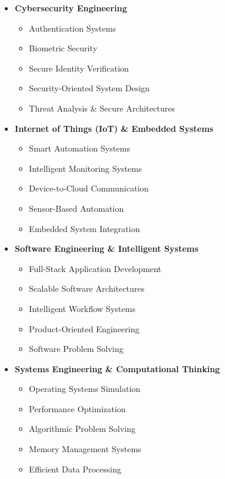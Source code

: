 \documentclass[a4paper,11pt]{article}
\begin{document}
\begin{itemize}[leftmargin=0.15in]

\item \textbf{Cybersecurity Engineering}
\begin{itemize}
    \item Authentication Systems
    \item Biometric Security
    \item Secure Identity Verification
    \item Security-Oriented System Design
    \item Threat Analysis \& Secure Architectures
\end{itemize}

\item \textbf{Internet of Things (IoT) \& Embedded Systems}
\begin{itemize}
    \item Smart Automation Systems
    \item Intelligent Monitoring Systems
    \item Device-to-Cloud Communication
    \item Sensor-Based Automation
    \item Embedded System Integration
\end{itemize}

\item \textbf{Software Engineering \& Intelligent Systems}
\begin{itemize}
    \item Full-Stack Application Development
    \item Scalable Software Architectures
    \item Intelligent Workflow Systems
    \item Product-Oriented Engineering
    \item Software Problem Solving
\end{itemize}

\item \textbf{Systems Engineering \& Computational Thinking}
\begin{itemize}
    \item Operating Systems Simulation
    \item Performance Optimization
    \item Algorithmic Problem Solving
    \item Memory Management Systems
    \item Efficient Data Processing
\end{itemize}


\end{itemize}
\end{document}
